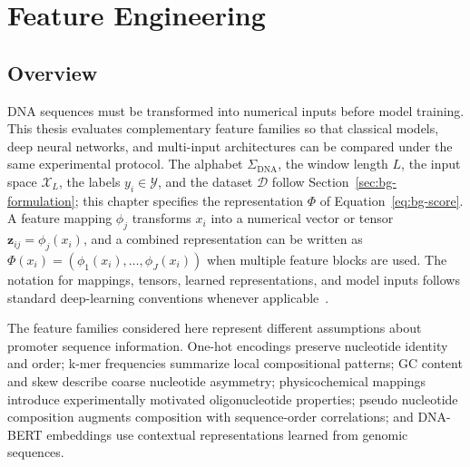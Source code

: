 \chapter{Feature Engineering}\label{chap:feature-engineering}

\section{Overview}\label{sec:features-overview}

DNA sequences must be transformed into numerical inputs before model training. This thesis evaluates complementary feature families so that classical models, deep neural networks, and multi-input architectures can be compared under the same experimental protocol. The alphabet $\Sigma_{\mathrm{DNA}}$, the window length $L$, the input space $\mathcal{X}_L$, the labels $y_i\in\mathcal{Y}$, and the dataset $\mathcal{D}$ follow Section~\ref{sec:bg-formulation}; this chapter specifies the representation $\Phi$ of Equation~\eqref{eq:bg-score}. A feature mapping $\phi_j$ transforms $x_i$ into a numerical vector or tensor $\mathbf{z}_{ij}=\phi_j(x_i)$, and a combined representation can be written as $\Phi(x_i)=\left(\phi_1(x_i),\ldots,\phi_J(x_i)\right)$ when multiple feature blocks are used. The notation for mappings, tensors, learned representations, and model inputs follows standard deep-learning conventions whenever applicable~\citep{goodfellow2016deep}.

The feature families considered here represent different assumptions about promoter sequence information. One-hot encodings preserve nucleotide identity and order; k-mer frequencies summarize local compositional patterns; GC content and skew describe coarse nucleotide asymmetry; physicochemical mappings introduce experimentally motivated oligonucleotide properties; pseudo nucleotide composition augments composition with sequence-order correlations; and DNA-BERT embeddings use contextual representations learned from genomic sequences.

